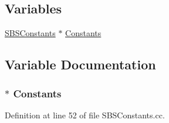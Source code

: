 \subsection*{Variables}
\begin{DoxyCompactItemize}
\item 
\hyperlink{class_s_b_s_constants}{S\-B\-S\-Constants} $\ast$ \hyperlink{_s_b_s_constants_8hh_a96b2d8ab1753781dd604fbe3a719733c}{Constants}
\end{DoxyCompactItemize}


\subsection{Variable Documentation}
\hypertarget{_s_b_s_constants_8hh_a96b2d8ab1753781dd604fbe3a719733c}{
\subsubsection[{Constants}]{$\ast$ Constants}}\label{_s_b_s_constants_8hh_a96b2d8ab1753781dd604fbe3a719733c}


Definition at line 52 of file S\-B\-S\-Constants.\-cc.

